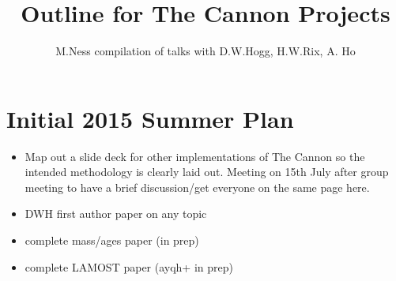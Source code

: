 \documentclass[11pt]{amsart}
\title{Outline for The Cannon Projects}
\author{M.Ness compilation of talks with D.W.Hogg, H.W.Rix, A. Ho}
\begin{document}
\maketitle

\section{Initial 2015 Summer Plan}
\begin{itemize}
\item Map out a slide deck for other implementations of The Cannon so the intended methodology is clearly laid out. Meeting on 15th July after group meeting to have a brief discussion/get everyone on the same page here.
\item DWH first author paper on any topic 
\item complete mass/ages paper (in prep)
\item complete LAMOST paper (ayqh+ in prep)
\end{itemize} 
\end{document}
